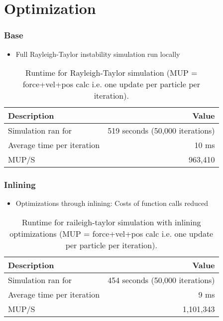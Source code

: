 
\section{Optimization}
\label{sec:opt}

\begin{frame}
    \frametitle{Base}
    \begin{itemize}
        \item Full Rayleigh-Taylor instability simulation run locally
    \end{itemize}
    \begin{table}[h!]
    \centering
    \begin{tabular}{|l|r|}
        \hline
        \textbf{Description} & \textbf{Value} \\ \hline
        Simulation ran for & 519 seconds (50,000 iterations) \\ \hline
        Average time per iteration & 10 ms \\ \hline
        MUP/S & 963,410 \\ \hline
    \end{tabular}
    \caption{Runtime for Rayleigh-Taylor simulation (MUP = force+vel+pos calc i.e. one update per particle per iteration). }
    \label{table:rayleigh_base}
    \end{table}
\end{frame}

\begin{frame}
    \frametitle{Inlining}
    \begin{itemize}
        \item Optimizations through inlining: Costs of function calls reduced
    \end{itemize}
    \begin{table}[h!]
    \centering
    \begin{tabular}{|l|r|}
        \hline
        \textbf{Description} & \textbf{Value} \\ \hline
        Simulation ran for & 454 seconds (50,000 iterations) \\ \hline
        Average time per iteration & 9 ms \\ \hline
        MUP/S & 1,101,343 \\ \hline
    \end{tabular}
    \caption{Runtime for raileigh-taylor simulation with inlining optimizations (MUP = force+vel+pos calc i.e. one update per particle per iteration).}
    \label{table:raileigh_inline}
    \end{table}
\end{frame}

